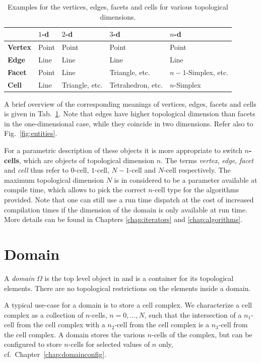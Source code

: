 \begin{table}[b]
 \centering 
 \renewcommand{\arraystretch}{1.3}
\begin{tabular}{|l|l|l|l|l|}
\hline
          &  $1$-d & $2$-d & $3$-d & $n$-d \\
\hline
 \textbf{Vertex}   & Point  & Point & Point & Point \\
 \textbf{Edge}     & Line   & Line  & Line  & Line \\
 \textbf{Facet}   & Point  & Line  & Triangle, etc. & $n-1$-Simplex, etc. \\
 \textbf{Cell}   & Line   & Triangle, etc. & Tetrahedron, etc. & $n$-Simplex \\
\hline
\end{tabular}
\caption{Examples for the vertices, edges, facets and cells for various topological dimensions.}
\label{tab:vertex-edge-facet-cell}
\end{table}

A brief overview of the corresponding meanings of vertices, edges, facets and cells is given in Tab.~\ref{tab:vertex-edge-facet-cell}. Note that edges have higher topological dimension than facets in the one-dimensional case, while they coincide in two dimensions. Refer also to Fig.~\ref{fig:entities}.

For a parametric description of these objects it is more appropriate to switch \textbf{$n$-cells}, which are objects of topological dimension $n$. The terms \emph{vertex}, \emph{edge}, \emph{facet} and \emph{cell} thus refer to $0$-cell, $1$-cell, $N-1$-cell and $N$-cell respectively. The maximum topological dimension $N$ is in {\ViennaGrid} considered to be a parameter available at compile time, which allows to pick the correct $n$-cell type for the algorithms provided. Note that one can still use a run time dispatch at the cost of increased compilation times if the dimension of the domain is only available at run time. More details can be found in Chapters \ref{chap:iterators} and \ref{chap:algorithms}.


\section{Domain}
A \emph{domain} $\Omega$ is the top level object in {\ViennaGrid} and is a container for its topological elements. There are no topological restrictions on the elements inside a domain. 

A typical use-case for a domain is to store a cell complex. We characterize a cell complex as a collection of $n$-cells, $n=0, \ldots, N$, such that the intersection of a $n_1$-cell from the cell complex with a $n_2$-cell from the cell complex is a $n_3$-cell from the cell complex. A domain stores the various $n$-cells of the complex, but can be configured to store $n$-cells for selected values of $n$ only, cf.~Chapter~\ref{chap:domainconfig}.

